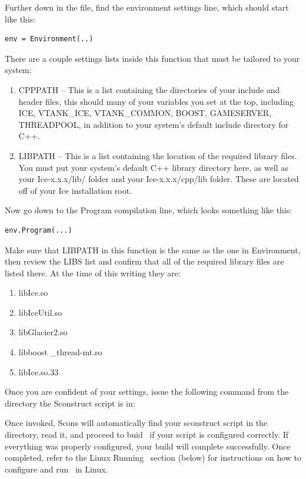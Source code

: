 Further down in the file, find the environment settings line, which should start like this:
\begin{verbatim}env = Environment(..)\end{verbatim}

There are a couple settings lists inside this function that must be tailored to your system:

\begin{enumerate}
\item CPPPATH -- This is a list containing the directories of your include and header files, this should many of your variables you set at the top, including ICE, VTANK\_ICE, VTANK\_COMMON, BOOST, GAMESERVER, THREADPOOL, in addition to your system's default include directory for C++.
\item LIBPATH -- This is a list containing the location of the required library files.  You must put your system's default C++ library directory here, as well as your Ice-x.x.x/lib/ folder and your Ice-x.x.x/cpp/lib folder.  These are located off of your Ice installation root.
\end{enumerate}

Now go down to the Program compilation line, which looks something like this:
\begin{verbatim}env.Program(...)\end{verbatim}

Make sure that LIBPATH in this function is the same as the one in Environment, then review the LIBS list and confirm that all of the required library files are listed there.  At the time of this writing they are:

\begin{enumerate}
\item libIce.so
\item libIceUtil.so
\item libGlacier2.so 
\item libboost \_thread-mt.so
\item libIce.so.33
\end{enumerate}

Once you are confident of your settings, issue the following command from the directory the Sconstruct script is in:


Once invoked, Scons will automatically find your sconstruct script in the directory, read it, and proceed to buid \GameServer\ if your script is configured correctly.  If everything was properly configured, your build will complete successfully.  Once completed, refer to the Linux Running \GameServer\ section (below) for instructions on how to configure and run \GameServer\ in Linux.
 
